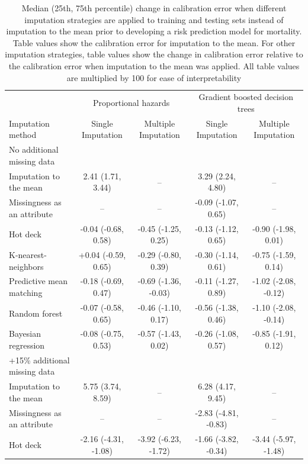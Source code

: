 \documentclass{article}
\begin{document}
\begin{table} 
 \caption{Median (25th, 75th percentile) change in calibration error when different imputation strategies are applied to training and testing sets instead of imputation to the mean prior to developing a risk prediction model for mortality. Table values show the calibration error for imputation to the mean. For other imputation strategies, table values show the change in calibration error relative to the calibration error when imputation to the mean was applied. All table values are multiplied by 100 for ease of interpretability} 
\label{tbl_md_strat_dead_cal_error} 
 
\begin{tabular}{lcccc}
\toprule
& \multicolumn{2}{c}{Proportional hazards} & \multicolumn{2}{c}{Gradient boosted decision trees} \\ 
 \cmidrule(lr){2-3}\cmidrule(lr){4-5}
Imputation method & Single Imputation & Multiple Imputation & Single Imputation & Multiple Imputation \\ 
\midrule
\multicolumn{1}{l}{No additional missing data} \\ 
\midrule
Imputation to the mean & 2.41 (1.71, 3.44) & -- & 3.29 (2.24, 4.80) & -- \\ 
Missingness as an attribute & -- & -- & -0.09 (-1.07, 0.65) & -- \\ 
Hot deck & -0.04 (-0.68, 0.58) & -0.45 (-1.25, 0.25) & -0.13 (-1.12, 0.65) & -0.90 (-1.98, 0.01) \\ 
K-nearest-neighbors & +0.04 (-0.59, 0.65) & -0.29 (-0.80, 0.39) & -0.30 (-1.14, 0.61) & -0.75 (-1.59, 0.14) \\ 
Predictive mean matching & -0.18 (-0.69, 0.47) & -0.69 (-1.36, -0.03) & -0.11 (-1.27, 0.89) & -1.02 (-2.08, -0.12) \\ 
Random forest & -0.07 (-0.58, 0.65) & -0.46 (-1.10, 0.17) & -0.56 (-1.38, 0.46) & -1.10 (-2.08, -0.14) \\ 
Bayesian regression & -0.08 (-0.75, 0.53) & -0.57 (-1.43, 0.02) & -0.26 (-1.08, 0.57) & -0.85 (-1.91, 0.12) \\ 
\midrule
\multicolumn{1}{l}{+15\% additional missing data} \\ 
\midrule
Imputation to the mean & 5.75 (3.74, 8.59) & -- & 6.28 (4.17, 9.45) & -- \\ 
Missingness as an attribute & -- & -- & -2.83 (-4.81, -0.83) & -- \\ 
Hot deck & -2.16 (-4.31, -1.08) & -3.92 (-6.23, -1.72) & -1.66 (-3.82, -0.34) & -3.44 (-5.97, -1.48) \\ 

\end{tabular}
\end{table}
\end{document}
